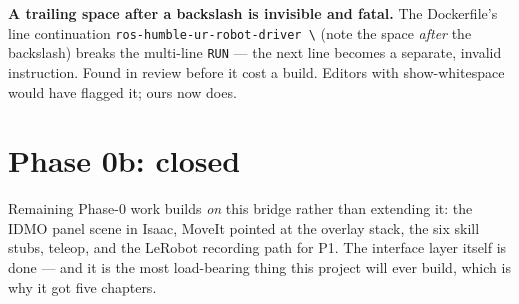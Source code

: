 \begin{lesson}
\textbf{A trailing space after a backslash is invisible and fatal.} The Dockerfile's line
continuation \texttt{ros-humble-ur-robot-driver \textbackslash\textvisiblespace} (note the
space \emph{after} the backslash) breaks the multi-line \texttt{RUN} --- the next line becomes
a separate, invalid instruction. Found in review before it cost a build. Editors with
show-whitespace would have flagged it; ours now does.
\end{lesson}

\section{Phase 0b: closed}

Remaining Phase-0 work builds \emph{on} this bridge rather than extending it: the IDMO panel
scene in Isaac, MoveIt pointed at the overlay stack, the six skill stubs, teleop, and the
LeRobot recording path for P1. The interface layer itself is done --- and it is the most
load-bearing thing this project will ever build, which is why it got five chapters.
